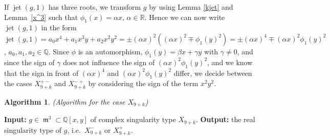 \documentclass{amsproc}
\DeclareMathOperator{\m}{\mathfrak{m}}
\DeclareMathOperator{\jt}{jet}
\begin{document}
If $\jt(g,1)$ has three roots, we transform $g$ by using Lemma \ref{kjet}
and Lemma~\ref{x^3} such that $\phi_1(x)=\alpha x$, $\alpha\in\mathbb R$. Hence we
can now
write $\jt(g,1)$ in the form $\jt(g,1)=a_0x^4+a_1x^3y+a_2x^2y^2=\pm(\alpha x)^2((\alpha
x)^2\mp\phi_1(y)^2)=\pm(\alpha x)^4\mp (\alpha x)^2\phi_1(y)^2$, $a_0,a_1,a_2\in\mathbb Q$. Since
$\phi$ is
an automorphism, $\phi_1(y)=\beta x+\gamma y$ with $\gamma \neq 0$,
and since the sign of $\gamma$ does not influence the sign of $(\alpha
x)^2\phi_1(y)^2$, and we know that the sign in front of $(\alpha x)^4$
and $(\alpha x)^2\phi_1(y)^2$ differ, we decide between the cases
$X_{9+k}^{+-}$ and $X_{9+k}^{-+}$ by considering the sign of the term $x^2y^2$.

\newtheorem{X[9+k]}[kjet]{Algorithm}
\begin{X[9+k]}(Algorithm for the case $X_{9+k}$)\label{X[9+k]}
\end{X[9+k]}
\noindent\textnormal{\bf Input:} $g\in \m^3\subset\mathbb Q[x,y]$ of complex
singularity type $X_{9+k}$.\newline
\textnormal{\bf Output:} the real singularity type of $g$, i.e.~$X_{9+k}^-$
or $X_{9+k}^+$.
\end{document}
